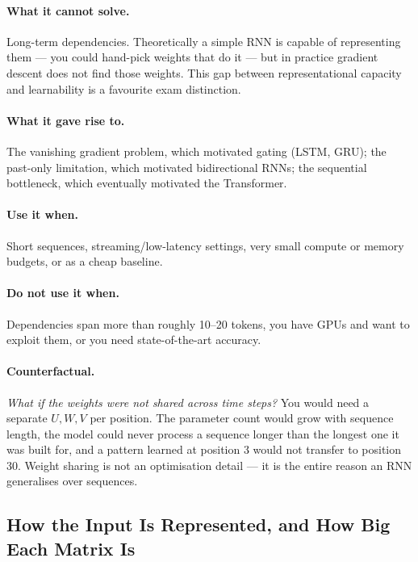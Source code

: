 \documentclass[11pt,a4paper]{article}
\begin{document}
\paragraph{What it cannot solve.} Long-term dependencies. Theoretically a simple RNN is
capable of representing them --- you could hand-pick weights that do it --- but in practice
gradient descent does not find those weights. This gap between representational capacity
and learnability is a favourite exam distinction.

\paragraph{What it gave rise to.} The vanishing gradient problem, which motivated gating
(LSTM, GRU); the past-only limitation, which motivated bidirectional RNNs; the sequential
bottleneck, which eventually motivated the Transformer.

\paragraph{Use it when.} Short sequences, streaming/low-latency settings, very small
compute or memory budgets, or as a cheap baseline.

\paragraph{Do not use it when.} Dependencies span more than roughly 10--20 tokens, you have
GPUs and want to exploit them, or you need state-of-the-art accuracy.

\paragraph{Counterfactual.} \emph{What if the weights were not shared across time steps?}
You would need a separate $U,W,V$ per position. The parameter count would grow with sequence
length, the model could never process a sequence longer than the longest one it was built
for, and a pattern learned at position 3 would not transfer to position 30. Weight sharing
is not an optimisation detail --- it is the entire reason an RNN generalises over sequences.

\subsection{How the Input Is Represented, and How Big Each Matrix Is}
\end{document}

